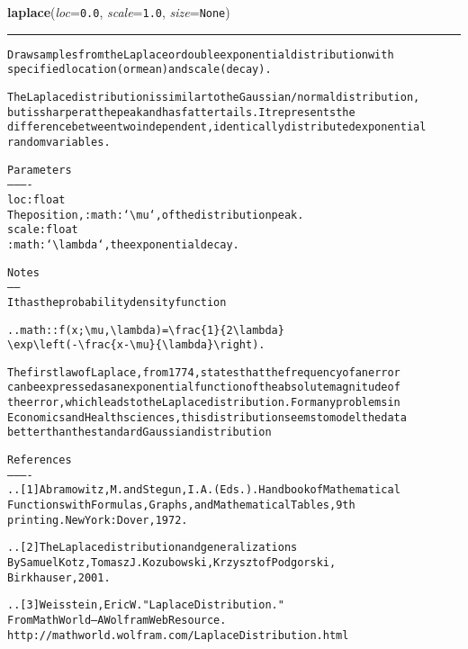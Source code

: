 \hspace{.8\funcindent}\begin{boxedminipage}{\funcwidth}

    \raggedright \textbf{laplace}(\textit{loc}={\tt 0.0}, \textit{scale}={\tt 1.0}, \textit{size}={\tt None})

    \vspace{-1.5ex}

    \rule{\textwidth}{0.5\fboxrule}
\setlength{\parskip}{2ex}
\begin{alltt}
Draw samples from the Laplace or double exponential distribution with
specified location (or mean) and scale (decay).

The Laplace distribution is similar to the Gaussian/normal distribution,
but is sharper at the peak and has fatter tails. It represents the
difference between two independent, identically distributed exponential
random variables.

Parameters
----------
loc : float
    The position, :math:`{\textbackslash}mu`, of the distribution peak.
scale : float
    :math:`{\textbackslash}lambda`, the exponential decay.

Notes
-----
It has the probability density function

.. math:: f(x; {\textbackslash}mu, {\textbackslash}lambda) = {\textbackslash}frac\{1\}\{2{\textbackslash}lambda\}
                               {\textbackslash}exp{\textbackslash}left(-{\textbackslash}frac\{{\textbar}x - {\textbackslash}mu{\textbar}\}\{{\textbackslash}lambda\}{\textbackslash}right).

The first law of Laplace, from 1774, states that the frequency of an error
can be expressed as an exponential function of the absolute magnitude of
the error, which leads to the Laplace distribution. For many problems in
Economics and Health sciences, this distribution seems to model the data
better than the standard Gaussian distribution


References
----------
.. [1] Abramowitz, M. and Stegun, I. A. (Eds.). Handbook of Mathematical
       Functions with Formulas, Graphs, and Mathematical Tables, 9th
       printing.  New York: Dover, 1972.

.. [2] The Laplace distribution and generalizations
       By Samuel Kotz, Tomasz J. Kozubowski, Krzysztof Podgorski,
       Birkhauser, 2001.

.. [3] Weisstein, Eric W. "Laplace Distribution."
       From MathWorld--A Wolfram Web Resource.
       http://mathworld.wolfram.com/LaplaceDistribution.html


\end{alltt}
\end{boxedminipage}
